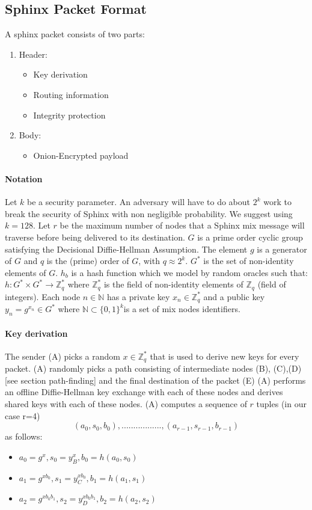 \subsection{Sphinx Packet Format}

A sphinx packet consists of two parts:
\begin{enumerate}
\item Header:
\begin{itemize}
\item Key derivation
\item Routing information
\item Integrity protection
\end{itemize}
\item Body:
\begin{itemize}
\item Onion-Encrypted payload
\end{itemize}
\end{enumerate}
\paragraph{Notation}
Let $k$ be a security parameter. An adversary will have to do about $2^k$ work to break the security of Sphinx with non negligible probability. We suggest using $k=128$.
Let $r$ be the maximum number of nodes that a Sphinx mix message will traverse before being delivered to its destination.
$G$ is a prime order cyclic group satisfying the Decisional Diffie-Hellman Assumption. The element $g$ is a generator of $G$ and $q$ is the (prime) order of $G$, with $q\approx 2^k$.
$G^*$ is the set of non-identity elements of $G$.
$h_b$ is a hash function which we model by random oracles such that:
$h:G^*\times G^*\rightarrow \mathbb{Z}^*_q$ where $\mathbb{Z}^*_q$ is the field of non-identity elements of $\mathbb{Z}_q$ (field of integers).
Each node $n\in \mathbb{N}$ has a private key $x_n\in \mathbb{Z}^*_q$ and a public key $y_n=g^{x_n}\in G^*$ where $\mathbb{N} \subset \{0,1\}^k$is a set of mix nodes identifiers.

\paragraph{Key derivation}
The sender (A) picks a random $x\in \mathbb{Z}^*_q$ that is used to derive new keys for every packet. 
\newline (A) randomly picks a path consisting of intermediate nodes (B), (C),(D) [see section path-finding] and the final destination of the packet (E) 
\newline (A) performs an offline Diffie-Hellman key exchange with each of these nodes and derives shared keys with each of these nodes.
\newline (A) computes a sequence of $r$ tuples (in our case r=4)  $$(a_0,s_0,b_0),.................,(a_{r-1},s_{r-1},b_{r-1})$$ as follows:
\begin{itemize}
\item $a_0=g^x,s_0=y^x_B,b_0=h(a_0,s_0)$
\item $a_1=g^{xb_0},s_1=y^{xb_0}_C,b_1=h(a_1,s_1)$
\item $a_2=g^{xb_0b_1},s_2=y^{xb_0b_1}_D,b_2=h(a_2,s_2)$
\end{itemize}

